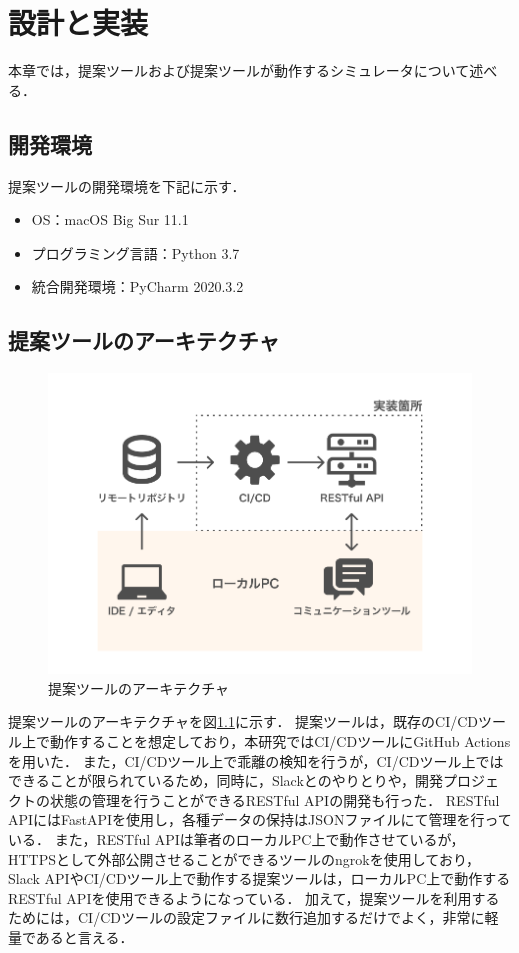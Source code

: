 \chapter{設計と実装}
本章では，提案ツールおよび提案ツールが動作するシミュレータについて述べる．

\section{開発環境}
提案ツールの開発環境を下記に示す．

\begin{itemize}
    \item OS：macOS Big Sur 11.1
    \item プログラミング言語：Python 3.7
    \item 統合開発環境：PyCharm 2020.3.2
\end{itemize}

\section{提案ツールのアーキテクチャ}
\label{toolartchitecture}

\begin{figure}[H]
    \centering
    \includegraphics[width=12cm]{images/architecture.png}
    \caption{提案ツールのアーキテクチャ}
    \label{architecture}
\end{figure}

提案ツールのアーキテクチャを図\ref{architecture}に示す．
提案ツールは，既存のCI/CDツール上で動作することを想定しており，本研究ではCI/CDツールにGitHub Actions\cite{actions}を用いた．
また，CI/CDツール上で乖離の検知を行うが，CI/CDツール上ではできることが限られているため，同時に，Slackとのやりとりや，開発プロジェクトの状態の管理を行うことができるRESTful APIの開発も行った．
RESTful APIにはFastAPIを使用し，各種データの保持はJSONファイルにて管理を行っている．
また，RESTful APIは筆者のローカルPC上で動作させているが，HTTPSとして外部公開させることができるツールのngrok\cite{ngrok}を使用しており，
Slack APIやCI/CDツール上で動作する提案ツールは，ローカルPC上で動作するRESTful APIを使用できるようになっている．
加えて，提案ツールを利用するためには，CI/CDツールの設定ファイルに数行追加するだけでよく，非常に軽量であると言える．

